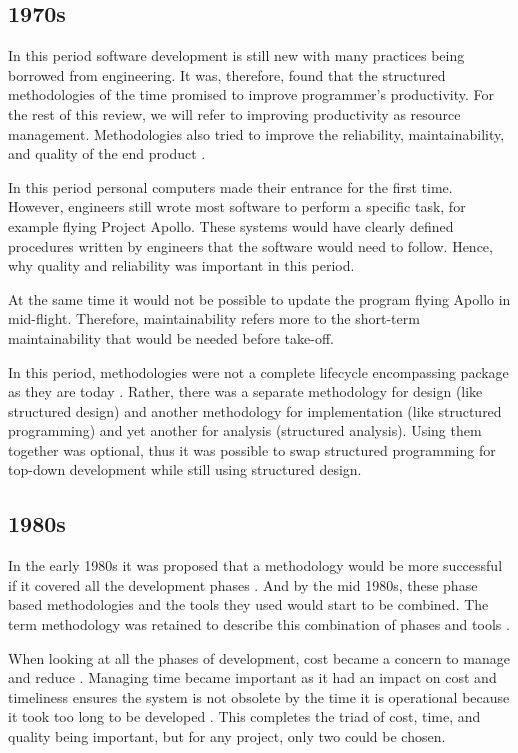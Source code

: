 \subsection{1970s}
In this period software development is still new with many practices being borrowed from engineering.
It was, therefore, found that the structured methodologies of the time promised to improve programmer's productivity.
For the rest of this review, we will refer to improving productivity as resource management.
Methodologies also tried to improve the reliability, maintainability, and quality of the end product \cite{yourdon_1977}.

In this period personal computers made their entrance for the first time.
However, engineers still wrote most software to perform a specific task, for example flying Project Apollo.
These systems would have clearly defined procedures written by engineers that the software would need to follow.
Hence, why quality and reliability was important in this period.

At the same time it would not be possible to update the program flying Apollo in mid-flight. 
Therefore, maintainability refers more to the short-term maintainability that would be needed before take-off.

In this period, methodologies were not a complete lifecycle encompassing package as they are today \cite{soi_1982, beregi_1985}.
Rather, there was a separate methodology for design (like structured design) and another methodology for implementation (like structured programming) and yet another for analysis (structured analysis).
Using them together was optional, thus it was possible to swap structured programming for top-down development while still using structured design. \cite{yourdon_1977}

\subsection{1980s}
In the early 1980s it was proposed that a methodology would be more successful if it covered all the development phases \cite{soi_1982}.
And by the mid 1980s, these phase based methodologies and the tools they used would start to be combined.
The term methodology was retained to describe this combination of phases and tools \cite{beregi_1985}. 

When looking at all the phases of development, cost became a concern to manage and reduce \cite{vanderlei_1983, peacham_1985, loesh_1985}.
Managing time became important as it had an impact on cost and timeliness ensures the system is not obsolete by the time it is operational because it took too long to be developed \cite{peacham_1985, beregi_1985, mannino_1987, paul_1993}.
This completes the triad of cost, time, and quality being important, but for any project, only two could be chosen.

